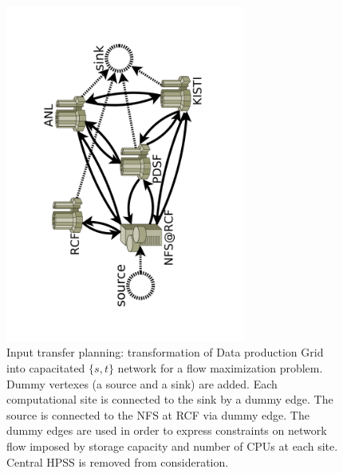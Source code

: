 \documentclass[english]{ddny}
\begin{document}
\begin{figure}[h]
	\begin{center}
		\includegraphics [trim= 30mm 30mm 30mm 30mm , clip, angle =-90, width=0.7\textwidth]{pic/real_network.pdf}
	\end{center}
	\caption{Input transfer planning: transformation of Data production Grid into   capacitated $\{s,t\}$ network for a flow maximization problem. Dummy vertexes (a source and a sink) are added. Each computational site is connected to the sink by a dummy edge. The source is connected to the NFS at RCF via dummy edge. The dummy edges are used in order to express constraints on network flow imposed by storage capacity and number of CPUs at each site.  Central HPSS is removed from consideration.}
	\label{real_network}
\end{figure} 
\end{document}
